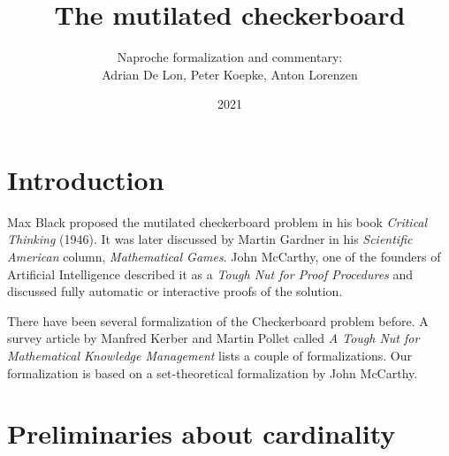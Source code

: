 \documentclass{article}
\title{The mutilated checkerboard}
\author{Naproche formalization and commentary:\\ Adrian De Lon, Peter Koepke, Anton Lorenzen}
\date{2021}
\begin{document}
\maketitle





\section{Introduction}

Max Black proposed the mutilated checkerboard problem in his book
\textit{Critical Thinking} (1946).
%
It was later discussed by Martin Gardner in his
\textit{Scientific American} column, \textit{Mathematical Games}.
%
John McCarthy, one of the
founders of Artificial Intelligence described it as a
\textit{Tough Nut for Proof Procedures}
and discussed fully automatic or interactive proofs of the solution.

There have been several formalization of the Checkerboard problem before. A
survey article by Manfred Kerber and Martin Pollet called \emph{A Tough Nut
for Mathematical Knowledge Management} lists a couple of formalizations.
Our formalization is based on a set-theoretical formalization by John McCarthy.


\begin{comment}
    \begin{forthel}
        [readtex preliminaries.ftl.tex]
        [synonym coordinate/-s]
        [synonym square/-s]
        [synonym subset/-s]
        
        Let $f : X\to Y$ stand for $f : X\rightarrow Y$.
    \end{forthel}
\end{comment}


\section{Preliminaries about cardinality}
\end{document}
